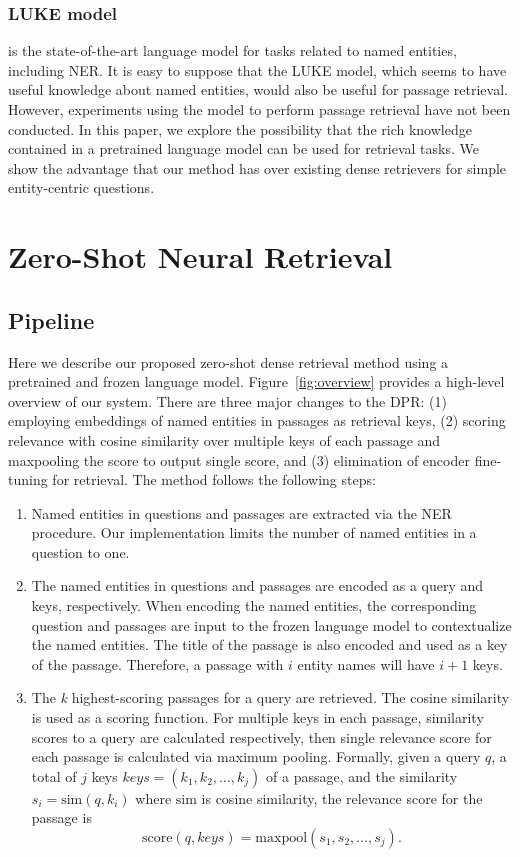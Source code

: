 \documentclass[letterpaper]{article} %
\begin{document}
\subsubsection{LUKE model} \citep{yamada-etal-2020-luke} is the state-of-the-art language model for tasks related to named entities, including NER.
It is easy to suppose that the LUKE model, which seems to have useful knowledge about named entities, would also be useful for passage retrieval.
However, experiments using the model to perform passage retrieval have not been conducted.
In this paper, we explore the possibility that the rich knowledge contained in a pretrained language model can be used for retrieval tasks.
We show the advantage that our method has over existing dense retrievers for simple entity-centric questions.


\section{Zero-Shot Neural Retrieval}\label{sec:method}
\subsection{Pipeline}\label{sec:pipeline}
Here we describe our proposed zero-shot dense retrieval method using a pretrained and frozen language model.
Figure~\ref{fig:overview} provides a high-level overview of our system.
There are three major changes to the DPR: (1) employing embeddings of named entities in passages as retrieval keys, (2) scoring relevance with cosine similarity over multiple keys of each passage and maxpooling the score to output single score, and (3) elimination of encoder fine-tuning for retrieval.
The method follows the following steps:
\begin{enumerate}
	\item Named entities in questions and passages are extracted via the NER procedure.
	      Our implementation limits the number of named entities in a question to one.
	\item The named entities in questions and passages are encoded as a query and keys, respectively.
	      When encoding the named entities, the corresponding question and passages are input to the frozen language model to contextualize the named entities.
	      The title of the passage is also encoded and used as a key of the passage.
	      Therefore, a passage with $i$ entity names will have $i+1$ keys.
	\item The \textit{k} highest-scoring passages for a query are retrieved.
	      The cosine similarity is used as a scoring function.
	      For multiple keys in each passage, similarity scores to a query are calculated respectively, then single relevance score for each passage is calculated via maximum pooling.
	      Formally, given a query $q$, a total of $j$ keys $keys = (k_1, k_2, \dots, k_j)$ of a passage, and the similarity $s_i = \text{sim}(q, k_i)$ where $\text{sim}$ is cosine similarity, the relevance score for the passage is
	      \[
		      \text{score}(q, keys) = \text{maxpool}(s_1, s_2, \dots, s_j).
	      \]
\end{enumerate}
\end{document}
